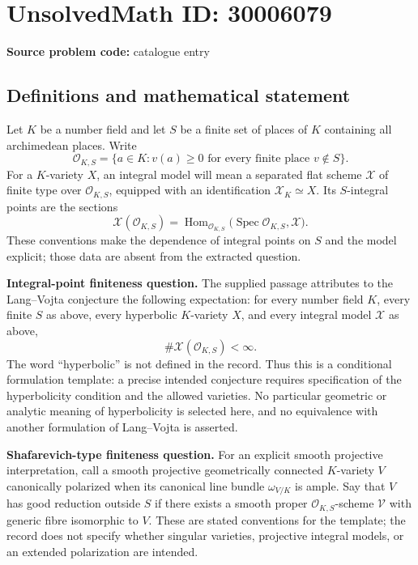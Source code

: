 \documentclass[11pt]{article}
\begin{document}
\section*{UnsolvedMath ID: 30006079}
\textbf{Source problem code:} catalogue entry
\subsection{Definitions and mathematical statement}
Let \(K\) be a number field and let \(S\) be a finite set of places of \(K\) containing all archimedean places. Write
\[
\mathcal O_{K,S}=\{a\in K:v(a)\geq 0\text{ for every finite place }v\notin S\}.
\]
For a \(K\)-variety \(X\), an integral model will mean a separated flat scheme \(\mathcal X\) of finite type over \(\mathcal O_{K,S}\), equipped with an identification \(\mathcal X_K\simeq X\). Its \(S\)-integral points are the sections
\[
\mathcal X(\mathcal O_{K,S})=
\operatorname{Hom}_{\mathcal O_{K,S}}
\bigl(\operatorname{Spec}\mathcal O_{K,S},\mathcal X\bigr).
\]
These conventions make the dependence of integral points on \(S\) and the model explicit; those data are absent from the extracted question.

\textbf{Integral-point finiteness question.}
The supplied passage attributes to the Lang--Vojta conjecture the following expectation: for every number field \(K\), every finite \(S\) as above, every hyperbolic \(K\)-variety \(X\), and every integral model \(\mathcal X\) as above,
\[
\#\mathcal X(\mathcal O_{K,S})<\infty.
\]
The word ``hyperbolic'' is not defined in the record. Thus this is a conditional formulation template: a precise intended conjecture requires specification of the hyperbolicity condition and the allowed varieties. No particular geometric or analytic meaning of hyperbolicity is selected here, and no equivalence with another formulation of Lang--Vojta is asserted.

\textbf{Shafarevich-type finiteness question.}
For an explicit smooth projective interpretation, call a smooth projective geometrically connected \(K\)-variety \(V\) canonically polarized when its canonical line bundle \(\omega_{V/K}\) is ample. Say that \(V\) has good reduction outside \(S\) if there exists a smooth proper \(\mathcal O_{K,S}\)-scheme \(\mathcal V\) with generic fibre isomorphic to \(V\). These are stated conventions for the template; the record does not specify whether singular varieties, projective integral models, or an extended polarization are intended.
\end{document}
